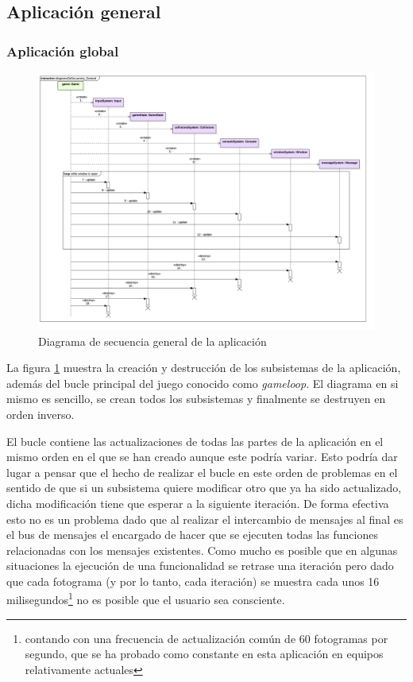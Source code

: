 \subsection{Aplicación general}

\subsubsection*{Aplicación global}

\begin{figure}
	\centerline{\includegraphics[width=19cm]{otros/UML/png/alld/png/CasosDeUso__General__Collaboration1__Interaction1__diagramaDeSecuencia_General_15.png}}
	\caption{Diagrama de secuencia general de la aplicación}
	\label{sec:general}
\end{figure}

La figura \ref{sec:general} muestra la creación y destrucción de los subsistemas de la aplicación, además del bucle principal del juego conocido como \textit{gameloop}. El diagrama en si mismo es sencillo, se crean todos los subsistemas y finalmente se destruyen en orden inverso.

\bigskip

El bucle contiene las actualizaciones de todas las partes de la aplicación en el mismo orden en el que se han creado aunque este podría variar. Esto podría dar lugar a pensar que el hecho de realizar el bucle en este orden de problemas en el sentido de que si un subsistema quiere modificar otro que ya ha sido actualizado, dicha modificación tiene que esperar a la siguiente iteración. De forma efectiva esto no es un problema dado que al realizar el intercambio de mensajes al final es el bus de mensajes el encargado de hacer que se ejecuten todas las funciones relacionadas con los mensajes existentes. Como mucho es posible que en algunas situaciones la ejecución de una funcionalidad se retrase una iteración pero dado que cada fotograma (y por lo tanto, cada iteración) se muestra cada unos 16 milisegundos\footnote{contando con una frecuencia de actualización común de 60 fotogramas por segundo, que se ha probado como constante en esta aplicación en equipos relativamente actuales} no es posible que el usuario sea consciente.

